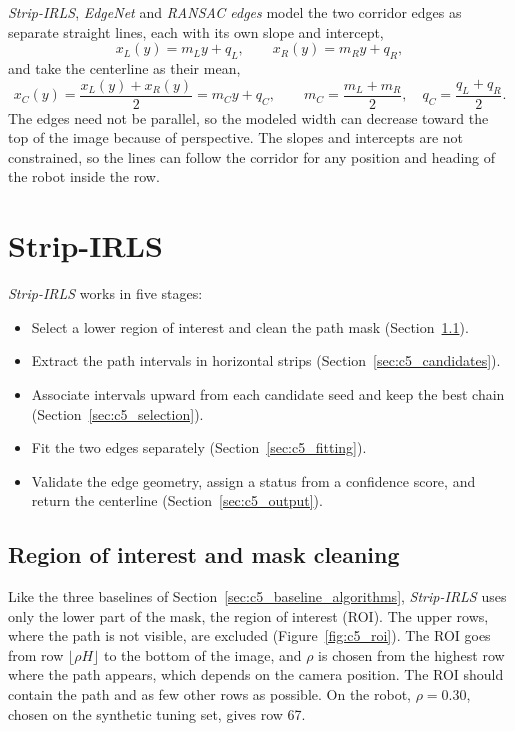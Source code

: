 \textit{Strip-IRLS}, \textit{EdgeNet} and \textit{RANSAC edges} model the two corridor edges as separate straight lines, each with its own slope and intercept,
\begin{equation}
    x_L(y)=m_Ly+q_L, \qquad x_R(y)=m_Ry+q_R,
    \label{eq:c5_edges}
\end{equation}
and take the centerline as their mean,
\begin{equation}
    x_C(y)=\frac{x_L(y)+x_R(y)}{2}=m_Cy+q_C,
    \qquad m_C=\frac{m_L+m_R}{2},\quad q_C=\frac{q_L+q_R}{2}.
    \label{eq:c5_line}
\end{equation}
The edges need not be parallel, so the modeled width can decrease toward the top of the image because of perspective. The slopes and intercepts are not constrained, so the lines can follow the corridor for any position and heading of the robot inside the row.

\section{Strip-IRLS}
\label{sec:c5_stripirls}

\textit{Strip-IRLS} works in five stages:
\begin{itemize}
    \item Select a lower region of interest and clean the path mask (Section~\ref{sec:c5_roi}).
    \item Extract the path intervals in horizontal strips (Section~\ref{sec:c5_candidates}).
    \item Associate intervals upward from each candidate seed and keep the best chain (Section~\ref{sec:c5_selection}).
    \item Fit the two edges separately (Section~\ref{sec:c5_fitting}).
    \item Validate the edge geometry, assign a status from a confidence score, and return the centerline (Section~\ref{sec:c5_output}).
\end{itemize}

\subsection{Region of interest and mask cleaning}
\label{sec:c5_roi}

Like the three baselines of Section~\ref{sec:c5_baseline_algorithms}, \textit{Strip-IRLS} uses only the lower part of the mask, the region of interest (ROI). The upper rows, where the path is not visible, are excluded (Figure~\ref{fig:c5_roi}). The ROI goes from row $\lfloor\rho H\rfloor$ to the bottom of the image, and $\rho$ is chosen from the highest row where the path appears, which depends on the camera position. The ROI should contain the path and as few other rows as possible. On the robot, $\rho=0.30$, chosen on the synthetic tuning set, gives row 67.

